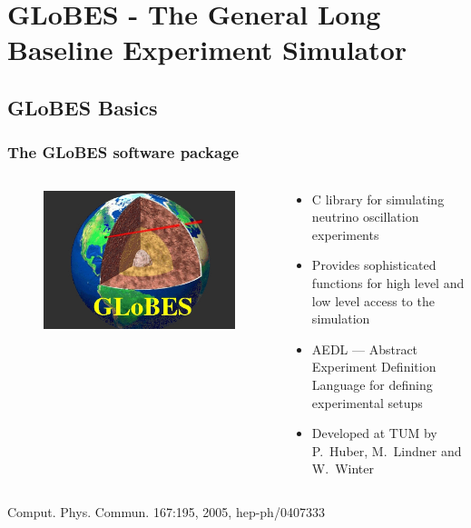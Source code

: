 \documentclass{beamer}
\newcommand{\reference}[1]{\tiny #1 \normalsize}
\begin{document}
\section{GLoBES - The General Long Baseline Experiment Simulator}

\subsection{GLoBES Basics}

\begin{frame}
  \frametitle{The GLoBES software package}

  \begin{columns}
    \begin{column}{6 cm}
      \begin{figure}
        \includegraphics[width=5 cm]{fig/globes_logo.jpg}
      \end{figure}
    \end{column}
    \begin{column}{6 cm}
      \begin{itemize}
        \item C library for simulating neutrino oscillation experiments
        \item Provides sophisticated functions for high level and low level access
              to the simulation
        \item AEDL --- Abstract Experiment Definition Language for defining experimental
              setups
        \item Developed at TUM by P.~Huber, M.~Lindner and W.~Winter \\
      \end{itemize}
    \end{column}
  \end{columns}
  \begin{flushright}
    \reference{Comput. Phys. Commun. 167:195, 2005, hep-ph/0407333}
  \end{flushright}
\end{frame}
\end{document}
